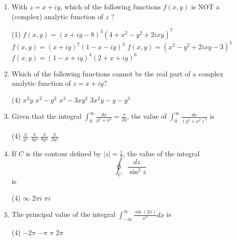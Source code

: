 \begin{enumerate}[label=\color{ocre}\textbf{\arabic*.}]
	{}
	\begin{tasks}(4)
		\task[\textbf{A.}] $-16 \pi i$
		\task[\textbf{B.}] $16 \pi \mathrm{i}$
		\task[\textbf{C.}] $8 \pi i$
		\task[\textbf{D.}] $2 \pi i$
	\end{tasks}
	\item  With $z=x+i y$, which of the following functions $f(x, y)$ is NOT a (complex) analytic function of $z$ ?
	{}
	\begin{tasks}(1)
		\task[\textbf{A.}] $f(x, y)=(x+i y-8)^{3}\left(4+x^{2}-y^{2}+2 i x y\right)^{7}$
		\task[\textbf{B.}] $f(x, y)=(x+i y)^{7}(1-x-i y)^{3}$
		\task[\textbf{C.}] $f(x, y)=\left(x^{2}-y^{2}+2 i x y-3\right)^{5}$
		\task[\textbf{D.}] $f(x, y)=(1-x+i y)^{4}(2+x+i y)^{6}$
	\end{tasks}
	\item  Which of the following functions cannot be the real part of a complex analytic function of $z=x+i y ?$
	{}
	\begin{tasks}(4)
		\task[\textbf{A.}] $x^{2} y$
		\task[\textbf{B.}]  $x^{2}-y^{2}$
		\task[\textbf{C.}] $x^{3}-3 x y^{2}$
		\task[\textbf{D.}] $3 x^{2} y-y-y^{3}$
	\end{tasks}
	\item  Given that the integral $\int_{0}^{\infty} \frac{d x}{y^{2}+x^{2}}=\frac{\pi}{2 y}$, the value of $\int_{0}^{\infty} \frac{d x}{\left(y^{2}+x^{2}\right)^{2}}$ is
	{}
	\begin{tasks}(4)
		\task[\textbf{A.}] $\frac{\pi}{y^{3}}$
		\task[\textbf{B.}] $\frac{\pi}{4 y^{3}}$
		\task[\textbf{C.}]  $\frac{\pi}{8 y^{3}}$
		\task[\textbf{D.}] $\frac{\pi}{2 y^{3}}$
	\end{tasks}
	\item If $C$ is the contour defined by $|z|=\frac{1}{2}$, the value of the integral
	$$
	\oint_{C} \frac{d z}{\sin ^{2} z}
	$$
	is
	{}
	\begin{tasks}(4)
		\task[\textbf{A.}] $\infty$
		\task[\textbf{B.}] $2 \pi i$
		\task[\textbf{D.}] $\pi i$
	\end{tasks}
	\item The principal value of the integral $\int_{-\infty}^{\infty} \frac{\sin (2 x)}{x^{3}} d x$ is
	{}
	\begin{tasks}(4)
		\task[\textbf{A.}] $-2 \pi$
		\task[\textbf{B.}]  $-\pi$
		\task[\textbf{C.}] $\pi$
		\task[\textbf{D.}]  $2 \pi$
	\end{tasks}

\end{enumerate}

